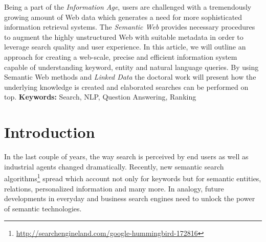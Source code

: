 


%
%
%




Being a part of the \emph{Information Age}, users are challenged with a tremendously growing amount of Web data which generates a need for more sophisticated information retrieval systems.
The \emph{Semantic Web} provides necessary procedures to augment the highly unstructured Web with suitable metadata in order to leverage search quality and user experience.
In this article, we will outline an approach for creating a web-scale, precise and efficient information system capable of understanding keyword, entity and natural language queries.
By using Semantic Web methods and \emph{Linked Data} the doctoral work will present how the underlying knowledge is created and elaborated searches can be performed on top.
\textbf{Keywords:} Search, NLP, Question Answering, Ranking

\section{Introduction}

In the last couple of years, the way search is perceived by end users as well as industrial agents changed dramatically.
Recently, new semantic search algorithms\footnote{\url{http://searchengineland.com/google-hummingbird-172816}} spread which account not only for keywords but for semantic entities, relations, personalized information and many more.
In analogy, future developments in everyday and business search engines need to unlock the power of semantic technologies.

